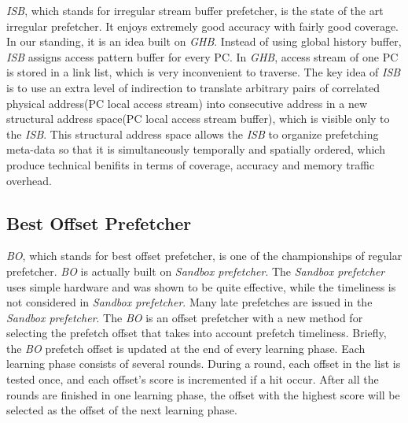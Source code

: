   \emph{ISB}, which stands for irregular stream buffer prefetcher, is the state of the art irregular prefetcher. It enjoys extremely good accuracy with fairly good coverage. In our standing, it is an idea built on \emph{GHB}\cite{ghbpaper}. Instead of using global history buffer, \emph{ISB} assigns access pattern buffer for every PC. In \emph{GHB}, access stream of one PC is stored in a link list, which is very inconvenient to traverse. The key idea of \emph{ISB} is to use an extra level of indirection to translate arbitrary pairs of correlated physical address(PC local access stream) into consecutive address in a new structural address space(PC local access stream buffer), which is visible only to the \emph{ISB}. This structural address space allows the \emph{ISB} to organize prefetching meta-data so that it is simultaneously temporally and spatially ordered, which produce technical benifits in terms of coverage, accuracy and memory traffic overhead.

  \subsection{Best Offset Prefetcher}
  \label{sec:bointro}
  \emph{BO}, which stands for best offset prefetcher, is one of the championships of regular prefetcher. \emph{BO} is actually built on \emph{Sandbox prefetcher}\cite{sandboxpaper}. The \emph{Sandbox prefetcher} uses simple hardware and was shown to be quite effective, while the timeliness is not considered in \emph{Sandbox prefetcher}. Many late prefetches are issued in the \emph{Sandbox prefetcher}. The \emph{BO} is an offset prefetcher with a new method for selecting the prefetch offset that takes into account prefetch timeliness. Briefly, the \emph{BO} prefetch offset is updated at the end of every learning phase. Each learning phase consists of several rounds. During a round, each offset in the list is tested once, and each offset's score is incremented if a hit occur. After all the rounds are finished in one learning phase, the offset with the highest score will be selected as the offset of the next learning phase.
